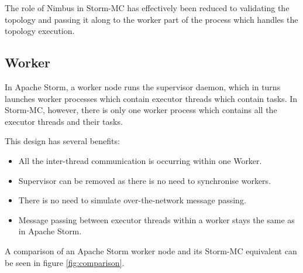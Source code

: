 \documentclass[bsc,logo,frontabs,twoside,singlespacing,normalheadings,parskip]{infthesis}     %
\begin{document}
The role of Nimbus in Storm-MC has effectively been reduced to validating the topology and passing it along to the worker part of the process which handles the topology execution.

\subsection{Worker}

In Apache Storm, a worker node runs the supervisor daemon, which in turns launches worker processes which contain executor threads which contain tasks. In Storm-MC, however, there is only one worker process which contains all the executor threads and their tasks.

This design has several benefits:

\begin{itemize}
	\item All the inter-thread communication is occurring within one Worker.
	\item Supervisor can be removed as there is no need to synchronise workers.
	\item There is no need to simulate over-the-network message passing.
	\item Message passing between executor threads within a worker stays the same as in Apache Storm.
\end{itemize}

A comparison of an Apache Storm worker node and its Storm-MC equivalent can be seen in figure \ref{fig:comparison}.
\end{document}
